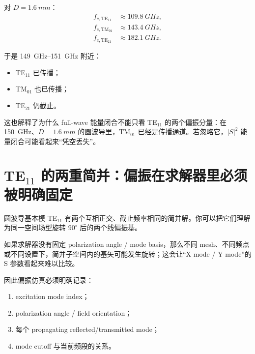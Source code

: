 \documentclass[11pt,a4paper,openany]{ctexrep}
\begin{document}
对 $D=\SI{1.6}{mm}$：
\[
\boxed{
\begin{aligned}
f_{c,\mathrm{TE}_{11}}&\approx\SI{109.8}{GHz},\\
f_{c,\mathrm{TM}_{01}}&\approx\SI{143.4}{GHz},\\
f_{c,\mathrm{TE}_{21}}&\approx\SI{182.1}{GHz}.
\end{aligned}}
\]

于是 \SIrange{149}{151}{GHz} 附近：
\begin{itemize}
  \item TE$_{11}$ 已传播；
  \item TM$_{01}$ 也已传播；
  \item TE$_{21}$ 仍截止。
\end{itemize}

\begin{projectbox}
这也解释了为什么 full-wave 能量闭合不能只看 TE$_{11}$ 的两个偏振分量：在 \SI{150}{GHz}、$D=\SI{1.6}{mm}$ 的圆波导里，TM$_{01}$ 已经是传播通道。若忽略它，$|S|^2$ 能量闭合可能看起来“凭空丢失”。
\end{projectbox}

\section{TE$_{11}$ 的两重简并：偏振在求解器里必须被明确固定}

圆波导基本模 TE$_{11}$ 有两个互相正交、截止频率相同的简并解。你可以把它们理解为同一空间场型旋转 $90^\circ$ 后的两个线偏振基。

\begin{center}
\end{center}

如果求解器没有固定 polarization angle / mode basis，那么不同 mesh、不同频点或不同设置下，简并子空间内的基矢可能发生旋转；这会让“X mode / Y mode”的 S 参数看起来难以比较。

因此偏振仿真必须明确记录：
\begin{enumerate}
  \item excitation mode index；
  \item polarization angle / field orientation；
  \item 每个 propagating reflected/transmitted mode；
  \item mode cutoff 与当前频段的关系。
\end{enumerate}
\end{document}
